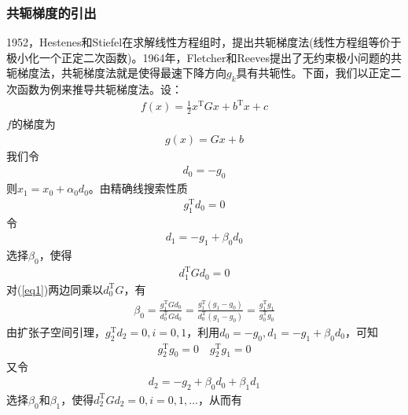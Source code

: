         \subsubsection{共轭梯度的引出}
            \par
            1952，Hestenes和Stiefel在求解线性方程组时，提出共轭梯度法(线性方程组等价于极小化一个正定二次函数)。1964年，Fletcher和Reeves提出了无约束极小问题的共轭梯度法，共轭梯度法就是使得最速下降方向$g_k$具有共轭性。下面，我们以正定二次函数为例来推导共轭梯度法。设：
            \begin{align*}
            f(x)=\frac 12 x^\mathrm{T} Gx+b^\mathrm{T} x+c
            \end{align*}
            $f$的梯度为
            \begin{align*}
            g(x)=Gx+b
            \end{align*}
            我们令
            \begin{align*}
            d_0=-g_0
            \end{align*}
            则$x_1=x_0+{\alpha}_0d_0$。由精确线搜索性质
            \begin{align*}
            g_1^\mathrm{T} d_0=0
            \end{align*}
            令
            \begin{align}
            \label{eq1}
            d_1=-g_1+{\beta}_0d_0
            \end{align}
            选择${\beta}_0$，使得
            \begin{align*}
            d_1^\mathrm{T} Gd_0=0
            \end{align*}
            对(\ref{eq1})两边同乘以$d_0^\mathrm{T} G$，有
            \begin{align*}
            {\beta}_0 = \frac {g_1^\mathrm{T} Gd_0}{d_0^\mathrm{T} Gd_0}= \frac {g_1^\mathrm{T} (g_1-g_0)}{d_0^\mathrm{T} (g_1-g_0)}= \frac {g_1^\mathrm{T} g_1}{g_0^\mathrm{T} g_0}
            \end{align*}
            由扩张子空间引理，$g_2^\mathrm{T} d_2=0,i=0,1$，利用$d_0=-g_0,d_1=-g_1+{\beta}_0d_0$，可知
            \begin{align*}
            g_2^\mathrm{T} g_0=0\quad g_2^\mathrm{T} g_1=0
            \end{align*}
            又令
            \begin{align*}
            d_2=-g_2+{\beta}_0d_0+{\beta}_1d_1
            \end{align*}
            选择${\beta}_0$和${\beta}_1 $，使得$d_2^\mathrm{T} Gd_2=0,i=0,1,\ldots$，从而有
